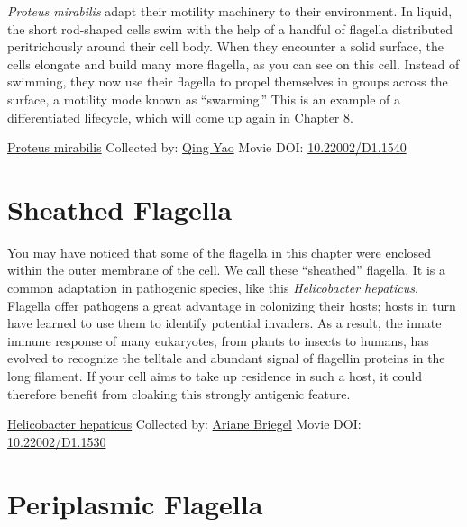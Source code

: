\documentclass[]{tufte-book}
\begin{document}
\emph{Proteus mirabilis} adapt their motility machinery to their environment. In liquid, the short rod-shaped cells swim with the help of a handful of flagella distributed peritrichously around their cell body. When they encounter a solid surface, the cells elongate and build many more flagella, as you can see on this cell. Instead of swimming, they now use their flagella to propel themselves in groups across the surface, a motility mode known as ``swarming.'' This is an example of a differentiated lifecycle, which will come up again in Chapter 8.



\hypertarget{htmlwidget-36b6bc7edca05ce51d19}{}

\label{fig:6-5a}\protect\hyperlink{tree}{Proteus mirabilis} Collected by: \protect\hyperlink{qing_yao}{Qing Yao} Movie DOI: \href{https://doi.org/10.22002/D1.1540}{10.22002/D1.1540}

\hypertarget{sheathed-flagella}{%
\section{Sheathed Flagella}\label{sheathed-flagella}}

You may have noticed that some of the flagella in this chapter were enclosed within the outer membrane of the cell. We call these ``sheathed'' flagella. It is a common adaptation in pathogenic species, like this \emph{Helicobacter hepaticus}. Flagella offer pathogens a great advantage in colonizing their hosts; hosts in turn have learned to use them to identify potential invaders. As a result, the innate immune response of many eukaryotes, from plants to insects to humans, has evolved to recognize the telltale and abundant signal of flagellin proteins in the long filament. If your cell aims to take up residence in such a host, it could therefore benefit from cloaking this strongly antigenic feature.



\hypertarget{htmlwidget-678b43cc2c1eba918039}{}

\label{fig:6-6}\protect\hyperlink{tree}{Helicobacter hepaticus} Collected by: \protect\hyperlink{ariane_briegel}{Ariane Briegel} Movie DOI: \href{https://doi.org/10.22002/D1.1530}{10.22002/D1.1530}

\hypertarget{periplasmic-flagella}{%
\section{Periplasmic Flagella}\label{periplasmic-flagella}}
\end{document}
